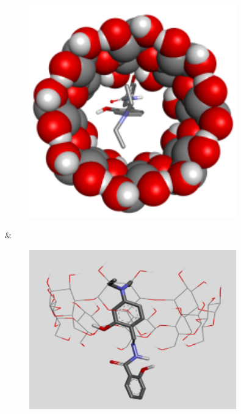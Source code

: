 \begin{figure}[H]
	\centering
	\includegraphics[width=0.8\textwidth]{media/chem2/image51}
	\caption*{}
\end{figure}
 &
\begin{figure}[H]
	\centering
	\includegraphics[width=0.8\textwidth]{media/chem2/image52}
	\caption*{}
\end{figure}
